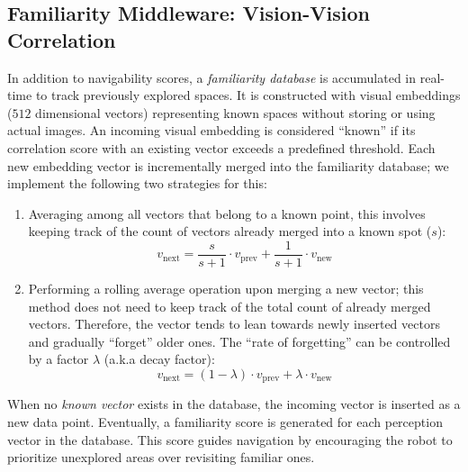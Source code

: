 

\subsection{Familiarity Middleware: Vision-Vision Correlation}\label{sec:arch/decision/familiarity}
In addition to navigability scores, a \textit{familiarity database} is accumulated in real-time to track previously explored spaces. It is constructed with visual embeddings ($512$ dimensional vectors) representing known spaces without storing or using actual images. An incoming visual embedding is considered ``known'' if its correlation score with an existing vector exceeds a predefined threshold. Each new embedding vector is incrementally merged into the familiarity database; we implement the following two strategies for this:
\begin{enumerate}[label={$\arabic*$.},nolistsep,leftmargin=*]
\item Averaging among all vectors that belong to a known point, this involves keeping track of the count of vectors already merged into a known spot ($s$):
$$
v_\text{next} = \frac{s}{s + 1} \cdot v_\text{prev} + \frac{1}{s + 1} \cdot v_\text{new}
$$

\item Performing a rolling average operation upon merging a new vector; this method does not need to keep track of the total count of already merged vectors. Therefore, the vector tends to lean towards newly inserted vectors and gradually ``forget'' older ones. The ``rate of forgetting'' can be controlled by a factor $\lambda$ (a.k.a decay factor):
$$
v_\text{next} = (1 - \lambda) \cdot v_\text{prev} + \lambda \cdot v_\text{new}
$$
\end{enumerate}
When no \textit{known vector} exists in the database, the incoming vector is inserted as a new data point. Eventually, a familiarity score is generated for each perception vector in the database. This score guides navigation by encouraging the robot to prioritize unexplored areas over revisiting familiar ones.




